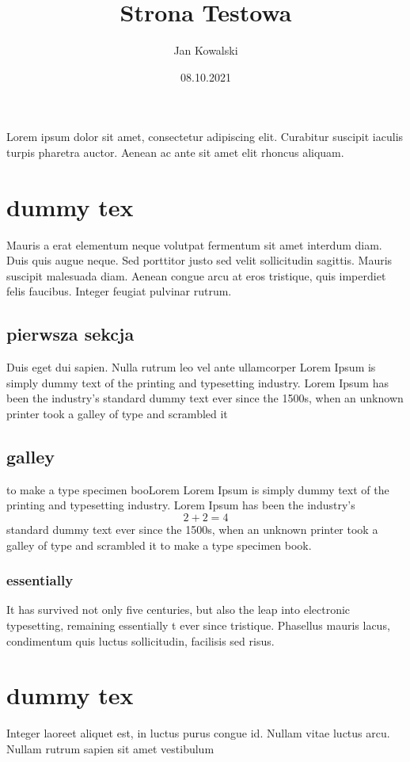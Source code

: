 \documentclass[12pt,legalpaper,fleqn,titlepage,twocolumn]{article}
\title{Strona Testowa}
\author{Jan Kowalski}
\date{08.10.2021}
\begin{document}
\maketitle
Lorem ipsum dolor sit amet, consectetur adipiscing elit. Curabitur suscipit iaculis turpis pharetra auctor. Aenean ac ante 
sit amet elit rhoncus aliquam.
\section{dummy tex}
 Mauris a erat elementum neque volutpat fermentum sit amet interdum diam. Duis quis augue neque.
Sed porttitor justo sed velit sollicitudin sagittis. Mauris suscipit malesuada diam. Aenean congue arcu at eros tristique, 
quis imperdiet felis faucibus. Integer feugiat pulvinar rutrum.
\subsection{pierwsza sekcja} Duis eget dui sapien. Nulla rutrum leo vel ante ullamcorper Lorem Ipsum is simply dummy text of the printing and typesetting industry. Lorem Ipsum has been the industry's standard dummy text ever since the 1500s, when an unknown printer took a galley of type and scrambled it 
\subsection{galley}
to make a type specimen booLorem Lorem Ipsum is simply dummy text of the printing and typesetting industry. Lorem Ipsum has been the industry's 
\begin{equation}
2+2=4
\end{equation}standard dummy text ever since the 1500s, when an unknown printer took a galley of type and scrambled it to make a type specimen book. 
\subsubsection{essentially}
It has survived not only five centuries, but also the leap into electronic typesetting, remaining essentially t ever since
tristique. Phasellus mauris lacus, condimentum quis luctus sollicitudin, facilisis sed risus.
\section{dummy tex} Integer laoreet aliquet est, in luctus purus congue id. Nullam 
vitae luctus arcu. Nullam rutrum sapien sit amet vestibulum 
\end{document}
